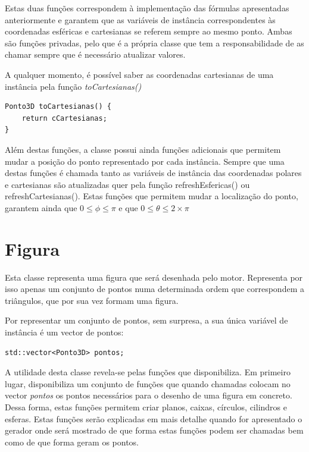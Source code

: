 Estas duas funções correspondem à implementação das fórmulas apresentadas anteriormente e garantem que as variáveis de instância correspondentes às coordenadas esféricas e cartesianas se referem sempre ao mesmo ponto. Ambas são funções privadas, pelo que é a própria classe que tem a responsabilidade de as chamar sempre que é necessário atualizar valores.

A qualquer momento, é possível saber as coordenadas cartesianas de uma instância pela função \textit{toCartesianas()}

\begin{Verbatim}
Ponto3D toCartesianas() {
	return cCartesianas;
}
\end{Verbatim}

Além destas funções, a classe possui ainda funções adicionais que permitem mudar a posição do ponto representado por cada instância. Sempre que uma destas funções é chamada tanto as variáveis de instância das coordenadas polares e cartesianas são atualizadas quer pela função refreshEsfericas() ou refreshCartesianas(). Estas funções que permitem mudar a localização do ponto, garantem ainda que $0 \leq \phi \leq \pi$ e que $0 \leq \theta \leq 2 \times \pi$

\newpage

\section{Figura}

Esta classe representa uma figura que será desenhada pelo motor. Representa por isso apenas um conjunto de pontos numa determinada ordem que correspondem a triângulos, que por sua vez formam uma figura.

Por representar um conjunto de pontos, sem surpresa, a sua única variável de instância é um vector de pontos:

\begin{Verbatim}
std::vector<Ponto3D> pontos;
\end{Verbatim}

A utilidade desta classe revela-se pelas funções que disponibiliza. Em primeiro lugar, disponibiliza um conjunto de funções que quando chamadas colocam no vector \textit{pontos} os pontos necessários para o desenho de uma figura em concreto. Dessa forma, estas funções permitem criar planos, caixas, círculos, cilindros e esferas. Estas funções serão explicadas em mais detalhe quando for apresentado o gerador onde será mostrado de que forma estas funções podem ser chamadas bem como de que forma geram os pontos.


